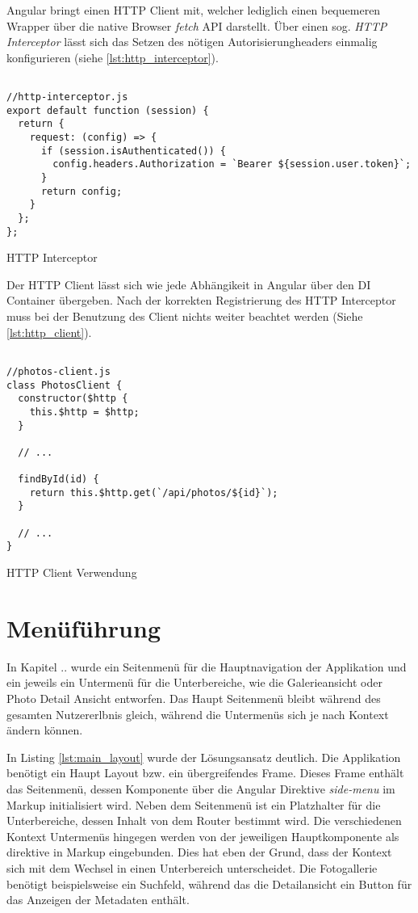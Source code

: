 Angular bringt einen HTTP Client mit, welcher lediglich einen bequemeren Wrapper über die native Browser \textit{fetch} API darstellt. Über einen sog. \textit{HTTP Interceptor} lässt sich das Setzen des nötigen Autorisierungheaders einmalig konfigurieren (siehe \ref{lst:http_interceptor}).

\begin{listing}[H]
\begin{verbatim}

//http-interceptor.js
export default function (session) {
  return {
    request: (config) => {
      if (session.isAuthenticated()) {
        config.headers.Authorization = `Bearer ${session.user.token}`;
      }
      return config;
    }
  };
};

\end{verbatim}
\caption{HTTP Interceptor}
\label{lst:http_interceptor}
\end{listing}

Der HTTP Client lässt sich wie jede Abhängikeit in Angular über den DI Container übergeben. Nach der korrekten Registrierung des HTTP Interceptor muss bei der Benutzung des Client nichts weiter beachtet werden (Siehe \ref{lst:http_client}).

\begin{listing}[H]
\begin{verbatim}

//photos-client.js
class PhotosClient {
  constructor($http {
    this.$http = $http;
  }

  // ...

  findById(id) {
    return this.$http.get(`/api/photos/${id}`);
  }

  // ...
}  

\end{verbatim}
\caption{HTTP Client Verwendung}
\label{lst:http_client}
\end{listing} 

\section{Menüführung}

In Kapitel .. wurde ein Seitenmenü für die Hauptnavigation der Applikation und ein jeweils ein Untermenü für die Unterbereiche, wie die Galerieansicht oder Photo Detail Ansicht entworfen. Das Haupt Seitenmenü bleibt während des gesamten Nutzererlbnis gleich, während die Untermenüs sich je nach Kontext ändern können.

In Listing \ref{lst:main_layout} wurde der Lösungsansatz deutlich. Die Applikation benötigt ein Haupt Layout bzw. ein übergreifendes Frame. Dieses Frame enthält das Seitenmenü, dessen Komponente über die Angular Direktive \textit{side-menu} im Markup initialisiert wird. Neben dem Seitenmenü ist ein Platzhalter für die Unterbereiche, dessen Inhalt von dem Router bestimmt wird. Die verschiedenen Kontext Untermenüs hingegen werden von der jeweiligen Hauptkomponente als direktive in Markup eingebunden. Dies hat eben der Grund, dass der Kontext sich mit dem Wechsel in einen Unterbereich unterscheidet. Die Fotogallerie benötigt beispielsweise ein Suchfeld, während das die Detailansicht ein Button für das Anzeigen der Metadaten enthält.

